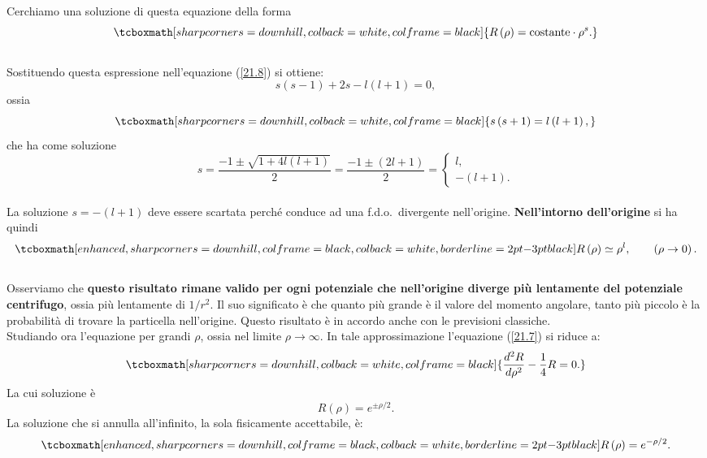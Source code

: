 Cerchiamo una soluzione di questa equazione della forma
	\begin{equation}
		\tcboxmath[sharp corners=downhill, colback=white, colframe=black]{
			R\left(\rho\right)=\mbox{costante}\cdot \rho^s .
			}
	\end{equation}\\

Sostituendo questa espressione nell'equazione (\ref{21.8}) si ottiene:
	\begin{equation}
		s\left(s-1\right)+2s-l\left(l+1\right)=0 ,
	\end{equation}
ossia
	\begin{equation}
		\tcboxmath[sharp corners=downhill, colback=white, colframe=black]{
		s\left(s+1\right)=l\left(l+1\right) ,
		}
	\end{equation}
che ha come soluzione
\begin{equation}
s=\frac{-1\pm\sqrt{1+4l\left(l+1\right)}}{2}=\frac{-1\pm\left(2l+1\right)}{2}=\begin{cases}l, \\-\left(l+1\right) . \end{cases}
\end{equation}\\

La soluzione $s=-\left(l+1\right)$ deve essere scartata perché  conduce ad una f.d.o.~divergente nell'origine. \textbf{Nell'intorno dell'origine} si ha quindi
	\begin{equation}
		\tcboxmath[enhanced, sharp corners=downhill, colframe=black, colback=white, borderline={2pt}{-3pt}{black}]{
			R\left(\rho\right)\simeq\rho^l ,
			} \qquad \left(\rho\rightarrow0\right) .
	\end{equation}\\

Osserviamo che \textbf{questo risultato rimane valido per ogni potenziale che nell'origine diverge più lentamente del potenziale centrifugo}, ossia più lentamente di $1/r^2$. Il suo significato è che quanto più grande è il valore del momento angolare, tanto più piccolo è la probabilità di trovare la particella nell'origine.
Questo risultato è in accordo anche con le previsioni classiche.\\

Studiando ora l'equazione per grandi $\rho$, ossia nel limite \textbf{$\rho\rightarrow\infty$}. In tale approssimazione l'equazione (\ref{21.7}) si riduce a:
	\begin{equation}
		\tcboxmath[sharp corners=downhill, colback=white, colframe=black]{
			\frac{d^2R}{d\rho^2}-\frac{1}{4}R=0 .
			}
	\end{equation}
La cui soluzione è
	\begin{equation}
		R\left(\rho\right)=e^{\pm\rho/2} . 
	\end{equation}
La soluzione che si annulla all'infinito, la sola fisicamente accettabile, è:
	\begin{equation}
		\tcboxmath[enhanced, sharp corners=downhill, colframe=black, colback=white, borderline={2pt}{-3pt}{black}]{
			R\left(\rho\right)=e^{-\rho/2} .
			}
	\end{equation}\\
	
